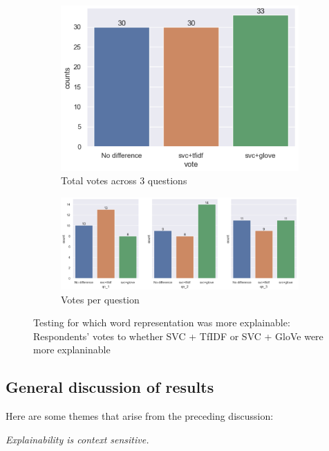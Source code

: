 \begin{figure}[!ht]
    \begin{subfigure}[b]{0.75\textwidth}
      \centering
      \includegraphics[width=1\linewidth]{figures/part5_votes.png}
      \caption{Total votes across 3 questions}
    \end{subfigure}
    \hfill
    \begin{subfigure}[b]{1\textwidth}
      \centering
      \includegraphics[width=1\linewidth]{figures/part_5_votes_1.png}
      \caption{Votes per question}
    \end{subfigure}
    \caption{Testing for which word representation was more explainable: Respondents' votes to whether SVC + TfIDF or SVC + GloVe were more explaninable}
    \label{fig:part5}
\end{figure}

\subsection{General discussion of results}
Here are some themes that arise from the preceding discussion:

\textit{Explainability is context sensitive.} 

